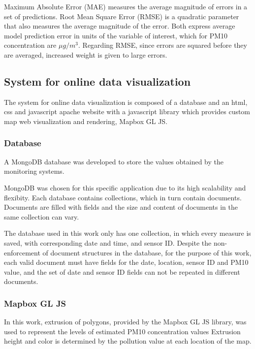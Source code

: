 Maximum Absolute Error (MAE) measures the average magnitude of errors in a set of predictions. Root Mean Square Error (RMSE) is a quadratic parameter that also measures the average magnitude of the error.
Both express average model prediction error in units of the variable of interest, which for PM10 concentration are $\mu g/m^3$. Regarding RMSE, since errors are squared before they are averaged, increased weight is given to large errors.


\subsection{System for online data visualization}

The system for online data visualization is composed of a database and an html, css and javascript apache website with a javascript library which provides custom map web visualization and rendering, Mapbox GL JS.

\subsubsection{Database}

A MongoDB database was developed to store the values obtained by the monitoring systems. 

MongoDB was chosen for this specific application due to its high scalability and flexibity. Each database contains collections, which in turn contain documents. Documents are filled with fields and the size and content of documents in the same collection can vary.

The database used in this work only has one collection, in which every measure is saved, with corresponding date and time, and sensor ID. Despite the non-enforcement of document structures in the database, for the purpose of this work, each valid document must have fields for the date, location, sensor ID and PM10 value, and the set of date and sensor ID fields can not be repeated in different documents.

\subsubsection{Mapbox GL JS}

In this work, extrusion of polygons, provided by the Mapbox GL JS library, was used to represent the levels of estimated PM10 concentration values Extrusion height and color is determined by the pollution value at each location of the map.

